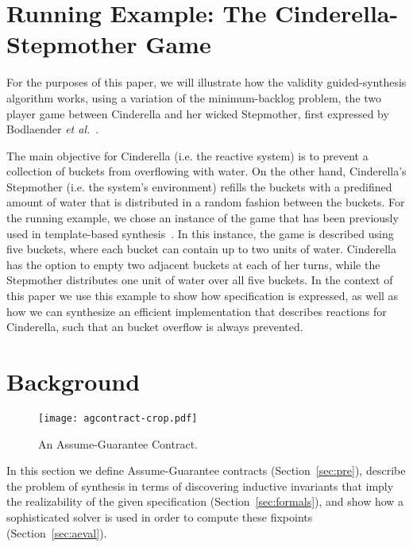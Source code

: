 \section{Running Example: The Cinderella-Stepmother Game}
\label{sec:example}

For the purposes of this paper, we will illustrate how the validity
guided-synthesis algorithm works, using a variation of the minimum-backlog
problem, the two player game between Cinderella and her wicked
Stepmother, first  expressed by Bodlaender \textit{et
al.}~\cite{bodlaender2012cinderella}.

The main objective for Cinderella (i.e. the reactive system) is to prevent a
collection of buckets from overflowing with water. On the other hand,
Cinderella's Stepmother (i.e. the system's environment) refills the buckets with a predifined amount of water that is distributed in a random fashion between the buckets.
For the running example, we chose an instance of the game that has been
previously used in template-based synthesis~\cite{beyene2014constraint}. In this instance, the game is described
using five buckets, where each bucket can contain up to two units of water.
Cinderella has the option to empty two adjacent buckets at each of her turns,
while the Stepmother distributes one unit of water over all five buckets. In the context of this paper we use this example to show how specification is expressed, as well as how we can synthesize an efficient implementation that describes reactions for Cinderella, such that an bucket overflow is always prevented.



\section{Background}
\label{sec:background}

\begin{figure}[!t]
\centering
\texttt{[image: agcontract-crop.pdf]}
\caption{An Assume-Guarantee Contract.}
\label{fg:agcontract}
\end{figure}


In this section we define Assume-Guarantee contracts (Section~\ref{sec:pre}),
describe the problem of synthesis in terms of discovering inductive invariants that imply the realizability of the given specification (Section~\ref{sec:formals}), and show how a sophisticated solver is used in order to compute these fixpoints (Section~\ref{sec:aeval}).

